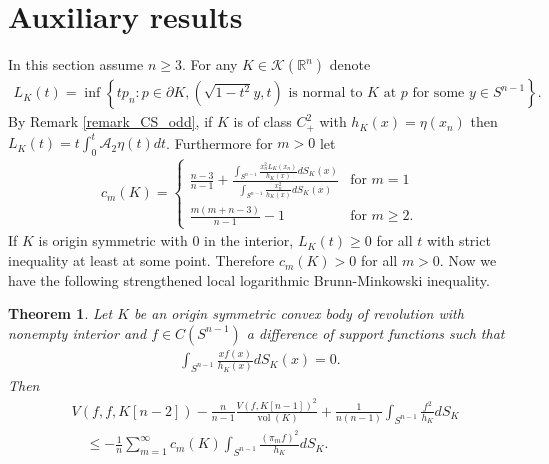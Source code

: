 \documentclass[12pt,twoside]{amsart}
\numberwithin{satz}{section}
\newtheorem{theorem}[satz]{Theorem}
\theoremstyle{definition}
\numberwithin{equation}{section}
\newcommand\R{\mathbb{R}}
\newcommand\vol{\operatorname{vol}}
\newcommand\Kc{\mathcal{K}}
\begin{document}
	\section{Auxiliary results}\label{section_aux_results}
	
	In this section assume $n\geq 3$. For any $K\in\Kc(\R^n)$ denote
	\begin{align*}
		L_K(t)=\inf\left\{tp_n:p\in\partial K,(\sqrt{1-t^2}y,t)\text{ is normal to }K\text{ at }p\text{ for some }y\in S^{n-1}\right\}.
	\end{align*}
	By Remark \ref{remark_CS_odd}, if $K$ is of class $C^2_+$ with $h_K(x)=\eta(x_n)$ then $L_K(t)=t\int_0^t\mathcal{A}_2\eta(t)dt$. Furthermore for $m>0$ let
	\begin{align*}
		c_m(K)= \begin{cases}
			\frac{n-3}{n-1}+\frac{\int_{S^{n-1}}\frac{x_n^2L_K(x_n)}{h_K(x)}dS_K(x)}{\int_{S^{n-1}}\frac{x_n^2}{h_K(x)}dS_K(x)} & \text{for } m=1 \\
			\frac{m(m+n-3)}{n-1}-1 & \text{for } m\geq 2.
		\end{cases}
	\end{align*}
	If $K$ is origin symmetric with $0$ in the interior, $L_K(t)\geq 0$ for all $t$ with strict inequality at least at some point. Therefore $c_m(K) >0$ for all $m>0$. Now we have the following strengthened local logarithmic Brunn-Minkowski inequality. 
	
	\begin{theorem}\label{stronger_loc_log_bm}
		Let $K$ be an origin symmetric convex body of revolution with nonempty interior and $f\in C(S^{n-1})$ a difference of support functions such that
		\begin{align*}
			\int_{S^{n-1}} \frac{xf(x)}{h_K(x)}dS_K(x)=0.
		\end{align*}
		Then
		\begin{align*}
			&V(f,f,K[n-2])-\frac{n}{n-1}\frac{V(f,K[n-1])^2}{\vol(K)}+\frac{1}{ n(n-1)}\int_{S^{n-1}}\frac{f^2}{h_K}dS_K \\
			& \quad \leq  -\frac{1}{n} \sum_{m=1}^\infty c_m(K) \int_{S^{n-1}} \frac{(\pi_mf)^2}{h_K}dS_K.
		\end{align*}
	\end{theorem}
	
\end{document}
